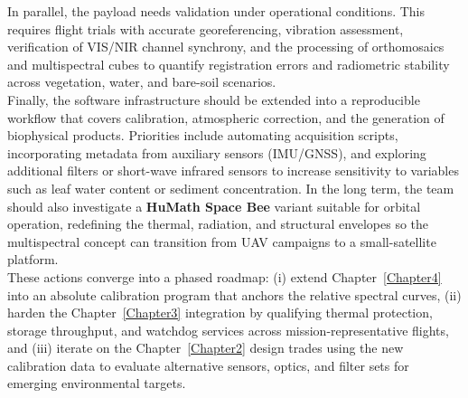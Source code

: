 \noindent In parallel, the payload needs validation under operational conditions. This requires flight trials with accurate georeferencing, vibration assessment, verification of VIS/NIR channel synchrony, and the processing of orthomosaics and multispectral cubes to quantify registration errors and radiometric stability across vegetation, water, and bare-soil scenarios.\\

\noindent Finally, the software infrastructure should be extended into a reproducible workflow that covers calibration, atmospheric correction, and the generation of biophysical products. Priorities include automating acquisition scripts, incorporating metadata from auxiliary sensors (IMU/GNSS), and exploring additional filters or short-wave infrared sensors to increase sensitivity to variables such as leaf water content or sediment concentration. In the long term, the team should also investigate a \textbf{HuMath Space Bee} \textregistered variant suitable for orbital operation, redefining the thermal, radiation, and structural envelopes so the multispectral concept can transition from UAV campaigns to a small-satellite platform.\\

\noindent These actions converge into a phased roadmap: (i) extend Chapter~\ref{Chapter4} into an absolute calibration program that anchors the relative spectral curves, (ii) harden the Chapter~\ref{Chapter3} integration by qualifying thermal protection, storage throughput, and watchdog services across mission-representative flights, and (iii) iterate on the Chapter~\ref{Chapter2} design trades using the new calibration data to evaluate alternative sensors, optics, and filter sets for emerging environmental targets.\\


